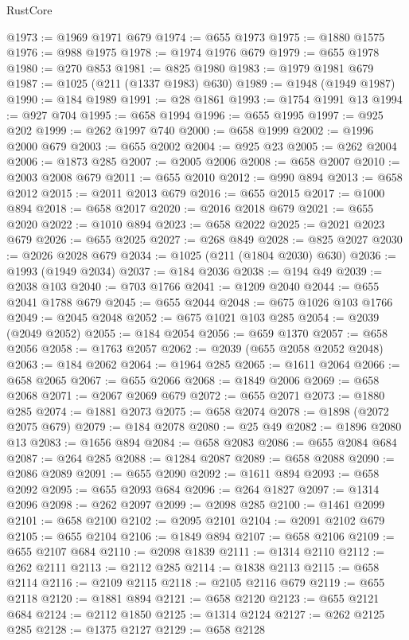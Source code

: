 \begin{lexlean}{RustCore}
\begin{coremodule}
@1973 := @1969 @1971 @679
@1974 := @655 @1973
@1975 := @1880 @1575
@1976 := @988 @1975
@1978 := @1974 @1976 @679
@1979 := @655 @1978
@1980 := @270 @853
@1981 := @825 @1980
@1983 := @1979 @1981 @679
@1987 := @1025 (@211 (@1337 @1983) @630)
@1989 := @1948 (@1949 @1987)
@1990 := @184 @1989
@1991 := @28 @1861
@1993 := @1754 @1991 @13
@1994 := @927 @704
@1995 := @658 @1994
@1996 := @655 @1995
@1997 := @925 @202
@1999 := @262 @1997 @740
@2000 := @658 @1999
@2002 := @1996 @2000 @679
@2003 := @655 @2002
@2004 := @925 @23
@2005 := @262 @2004
@2006 := @1873 @285
@2007 := @2005 @2006
@2008 := @658 @2007
@2010 := @2003 @2008 @679
@2011 := @655 @2010
@2012 := @990 @894
@2013 := @658 @2012
@2015 := @2011 @2013 @679
@2016 := @655 @2015
@2017 := @1000 @894
@2018 := @658 @2017
@2020 := @2016 @2018 @679
@2021 := @655 @2020
@2022 := @1010 @894
@2023 := @658 @2022
@2025 := @2021 @2023 @679
@2026 := @655 @2025
@2027 := @268 @849
@2028 := @825 @2027
@2030 := @2026 @2028 @679
@2034 := @1025 (@211 (@1804 @2030) @630)
@2036 := @1993 (@1949 @2034)
@2037 := @184 @2036
@2038 := @194 @49
@2039 := @2038 @103
@2040 := @703 @1766
@2041 := @1209 @2040
@2044 := @655 @2041 @1788 @679
@2045 := @655 @2044
@2048 := @675 @1026 @103 @1766
@2049 := @2045 @2048
@2052 := @675 @1021 @103 @285
@2054 := @2039 (@2049 @2052)
@2055 := @184 @2054
@2056 := @659 @1370
@2057 := @658 @2056
@2058 := @1763 @2057
@2062 := @2039 (@655 @2058 @2052 @2048)
@2063 := @184 @2062
@2064 := @1964 @285
@2065 := @1611 @2064
@2066 := @658 @2065
@2067 := @655 @2066
@2068 := @1849 @2006
@2069 := @658 @2068
@2071 := @2067 @2069 @679
@2072 := @655 @2071
@2073 := @1880 @285
@2074 := @1881 @2073
@2075 := @658 @2074
@2078 := @1898 (@2072 @2075 @679)
@2079 := @184 @2078
@2080 := @25 @49
@2082 := @1896 @2080 @13
@2083 := @1656 @894
@2084 := @658 @2083
@2086 := @655 @2084 @684
@2087 := @264 @285
@2088 := @1284 @2087
@2089 := @658 @2088
@2090 := @2086 @2089
@2091 := @655 @2090
@2092 := @1611 @894
@2093 := @658 @2092
@2095 := @655 @2093 @684
@2096 := @264 @1827
@2097 := @1314 @2096
@2098 := @262 @2097
@2099 := @2098 @285
@2100 := @1461 @2099
@2101 := @658 @2100
@2102 := @2095 @2101
@2104 := @2091 @2102 @679
@2105 := @655 @2104
@2106 := @1849 @894
@2107 := @658 @2106
@2109 := @655 @2107 @684
@2110 := @2098 @1839
@2111 := @1314 @2110
@2112 := @262 @2111
@2113 := @2112 @285
@2114 := @1838 @2113
@2115 := @658 @2114
@2116 := @2109 @2115
@2118 := @2105 @2116 @679
@2119 := @655 @2118
@2120 := @1881 @894
@2121 := @658 @2120
@2123 := @655 @2121 @684
@2124 := @2112 @1850
@2125 := @1314 @2124
@2127 := @262 @2125 @285
@2128 := @1375 @2127
@2129 := @658 @2128

\end{coremodule}
\end{lexlean}
